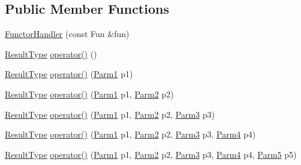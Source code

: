 \subsection*{Public Member Functions}
\begin{DoxyCompactItemize}
\item 
\mbox{\hyperlink{classUtil_1_1FunctorHandler_aa8b8cd815a79a27be8585210d8dccdb5}{Functor\+Handler}} (const Fun \&fun)
\item 
\mbox{\hyperlink{classUtil_1_1FunctorHandler_a036da44b8cc2567704cebd2a20d16c80}{Result\+Type}} \mbox{\hyperlink{classUtil_1_1FunctorHandler_a568e55043d17f0034572b4ad2772391e}{operator()}} ()
\item 
\mbox{\hyperlink{classUtil_1_1FunctorHandler_a036da44b8cc2567704cebd2a20d16c80}{Result\+Type}} \mbox{\hyperlink{classUtil_1_1FunctorHandler_a38485a110bfa7b2fdb5e34553d2f7264}{operator()}} (\mbox{\hyperlink{classUtil_1_1FunctorHandler_a0a902ba40a0ab746f1c29a81d68ae0db}{Parm1}} p1)
\item 
\mbox{\hyperlink{classUtil_1_1FunctorHandler_a036da44b8cc2567704cebd2a20d16c80}{Result\+Type}} \mbox{\hyperlink{classUtil_1_1FunctorHandler_a464269162477cf2b95690d94ec3fa02c}{operator()}} (\mbox{\hyperlink{classUtil_1_1FunctorHandler_a0a902ba40a0ab746f1c29a81d68ae0db}{Parm1}} p1, \mbox{\hyperlink{classUtil_1_1FunctorHandler_a5fb5374c316f8ac252aa22fcdf7d21a7}{Parm2}} p2)
\item 
\mbox{\hyperlink{classUtil_1_1FunctorHandler_a036da44b8cc2567704cebd2a20d16c80}{Result\+Type}} \mbox{\hyperlink{classUtil_1_1FunctorHandler_a7f8257ee5864ceec038116184231eb63}{operator()}} (\mbox{\hyperlink{classUtil_1_1FunctorHandler_a0a902ba40a0ab746f1c29a81d68ae0db}{Parm1}} p1, \mbox{\hyperlink{classUtil_1_1FunctorHandler_a5fb5374c316f8ac252aa22fcdf7d21a7}{Parm2}} p2, \mbox{\hyperlink{classUtil_1_1FunctorHandler_a25f1b9dd7890c1dbc68abc686f30bec8}{Parm3}} p3)
\item 
\mbox{\hyperlink{classUtil_1_1FunctorHandler_a036da44b8cc2567704cebd2a20d16c80}{Result\+Type}} \mbox{\hyperlink{classUtil_1_1FunctorHandler_a2d310b7fe0c60af9889d0ac218406cd9}{operator()}} (\mbox{\hyperlink{classUtil_1_1FunctorHandler_a0a902ba40a0ab746f1c29a81d68ae0db}{Parm1}} p1, \mbox{\hyperlink{classUtil_1_1FunctorHandler_a5fb5374c316f8ac252aa22fcdf7d21a7}{Parm2}} p2, \mbox{\hyperlink{classUtil_1_1FunctorHandler_a25f1b9dd7890c1dbc68abc686f30bec8}{Parm3}} p3, \mbox{\hyperlink{classUtil_1_1FunctorHandler_a2e8ca7556b379684e9b76029e77dd644}{Parm4}} p4)
\item 
\mbox{\hyperlink{classUtil_1_1FunctorHandler_a036da44b8cc2567704cebd2a20d16c80}{Result\+Type}} \mbox{\hyperlink{classUtil_1_1FunctorHandler_ac1478c707a9427b018db933037331564}{operator()}} (\mbox{\hyperlink{classUtil_1_1FunctorHandler_a0a902ba40a0ab746f1c29a81d68ae0db}{Parm1}} p1, \mbox{\hyperlink{classUtil_1_1FunctorHandler_a5fb5374c316f8ac252aa22fcdf7d21a7}{Parm2}} p2, \mbox{\hyperlink{classUtil_1_1FunctorHandler_a25f1b9dd7890c1dbc68abc686f30bec8}{Parm3}} p3, \mbox{\hyperlink{classUtil_1_1FunctorHandler_a2e8ca7556b379684e9b76029e77dd644}{Parm4}} p4, \mbox{\hyperlink{classUtil_1_1FunctorHandler_aeb1492d58534bb15702063e862e459c6}{Parm5}} p5)

\end{DoxyCompactItemize}
